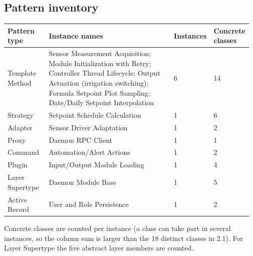 \documentclass[11pt,a4paper]{article}
\begin{document}
\subsection{Pattern inventory}
{\small\setlength{\tabcolsep}{3pt}
\begin{longtable}{@{}P{0.17\linewidth}P{0.54\linewidth}P{0.12\linewidth}P{0.14\linewidth}@{}}\toprule
\textbf{Pattern type} & \textbf{Instance names} & \textbf{Instances} & \textbf{Concrete classes} \\ \midrule\endhead
Template Method & Sensor Measurement Acquisition; Module Initialization with Retry; Controller Thread Lifecycle; Output Actuation (irrigation switching); Formula Setpoint Plot Sampling; Date/Daily Setpoint Interpolation & 6 & 14 \\
Strategy & Setpoint Schedule Calculation & 1 & 6 \\
Adapter & Sensor Driver Adaptation & 1 & 2 \\
Proxy & Daemon RPC Client & 1 & 1 \\
Command & Automation/Alert Actions & 1 & 2 \\
Plugin & Input/Output Module Loading & 1 & 4 \\
Layer Supertype & Daemon Module Base & 1 & 5 \\
Active Record & User and Role Persistence & 1 & 2 \\
\bottomrule\end{longtable}}
Concrete classes are counted per instance (a class can take part in several instances, so the column sum is larger than the 18 distinct classes in 2.1). For Layer Supertype the five abstract layer members are counted.\par
\end{document}
